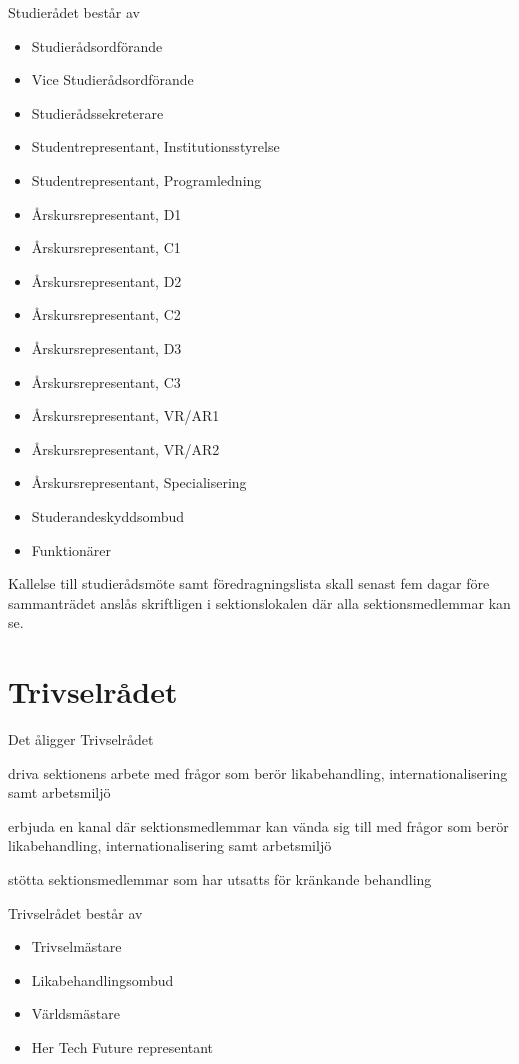 \documentclass[pdfbookmarks,a4paper,11pt]{article}
\newlength{\itemcollength}
\newenvironment{reglemlista}{%
  \begin{list}{}{%
      \setlength{\labelwidth}{\itemcollength}%
      \setlength{\leftmargin}{\labelwidth + \labelsep}%
      \renewcommand{\makelabel}[1]{%
        \raisebox{0pt}[1ex][0pt]{%
          \makebox[\labelwidth][l]{%
            \parbox[t]{\itemcollength}{%
              \raggedright\hspace{0pt}##1}}}\hfill}%
      }}{%
  \end{list}}
\begin{document}
\begin{reglemlista}
		\item[Sammansättning]
	Studierådet består av
	\begin{itemize}
		\item Studierådsordförande
		\item Vice Studierådsordförande
		\item Studierådssekreterare
		\item Studentrepresentant, Institutionsstyrelse
		\item Studentrepresentant, Programledning
		\item Årskursrepresentant, D1
		\item Årskursrepresentant, C1
		\item Årskursrepresentant, D2
		\item Årskursrepresentant, C2
		\item Årskursrepresentant, D3
		\item Årskursrepresentant, C3
		\item Årskursrepresentant, VR/AR1
		\item Årskursrepresentant, VR/AR2
        \item Årskursrepresentant, Specialisering
		\item Studerandeskyddsombud
		\item Funktionärer
	\end{itemize}

	\item[Kallelse]
	Kallelse till studierådsmöte samt föredragningslista skall senast fem
	dagar före sammanträdet anslås skriftligen i sektionslokalen där alla sektionsmedlemmar kan se.

\end{reglemlista}

\section{Trivselrådet}

\begin{reglemlista}

	\item[Åligganden]
	Det åligger Trivselrådet
	\begin{attlista}
		\item driva sektionens arbete med frågor som berör likabehandling, internationalisering samt arbetsmiljö
		\item erbjuda en kanal där sektionsmedlemmar kan vända sig till med frågor som berör likabehandling, internationalisering samt arbetsmiljö
		\item stötta sektionsmedlemmar som har utsatts för kränkande behandling
	\end{attlista}
	\item[Sammansättning]
	Trivselrådet består av
	\begin{itemize}
		\item Trivselmästare
		\item Likabehandlingsombud
		\item Världsmästare
		\item Her Tech Future representant
	\end{itemize}

\end{reglemlista}
\end{document}
